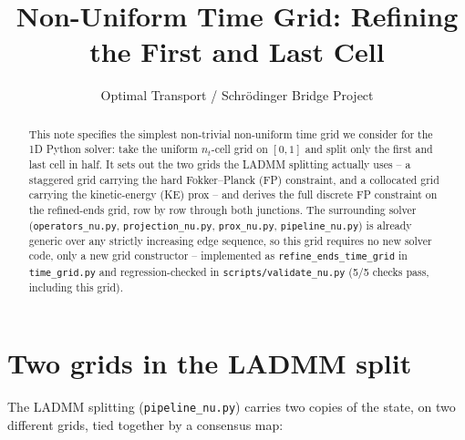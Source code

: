 \documentclass[11pt]{article}
\title{Non-Uniform Time Grid: Refining the First and Last Cell}
\author{Optimal Transport / Schr\"odinger Bridge Project}
\date{}
\newcommand{\code}[1]{\texttt{#1}}
\begin{document}
\maketitle

\begin{abstract}
This note specifies the simplest non-trivial non-uniform time grid we consider for the
1D Python solver: take the uniform $n_t$-cell grid on $[0,1]$ and split only the first
and last cell in half. It sets out the two grids the LADMM splitting actually uses --
a staggered grid carrying the hard Fokker--Planck (FP) constraint, and a collocated grid
carrying the kinetic-energy (KE) prox -- and derives the full discrete FP constraint on
the refined-ends grid, row by row through both junctions. The surrounding solver
(\code{operators\_nu.py}, \code{projection\_nu.py}, \code{prox\_nu.py},
\code{pipeline\_nu.py}) is already generic over any strictly increasing edge sequence, so
this grid requires no new solver code, only a new grid constructor -- implemented as
\code{refine\_ends\_time\_grid} in \code{time\_grid.py} and regression-checked in
\code{scripts/validate\_nu.py} (5/5 checks pass, including this grid).
\end{abstract}

\section{Two grids in the LADMM split}
\label{sec:two-grids}

The LADMM splitting (\code{pipeline\_nu.py}) carries two copies of the state, on two
different grids, tied together by a consensus map:
\end{document}
